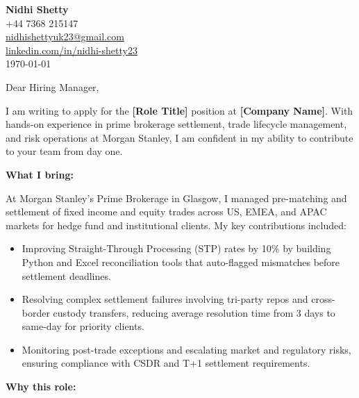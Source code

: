 \documentclass[11pt,a4paper]{article}
\begin{document}
\begin{flushleft}
{\large\bfseries Nidhi Shetty} \\[4pt]
+44 7368 215147 \\
\href{mailto:nidhishettyuk23@gmail.com}{nidhishettyuk23@gmail.com} \\
\href{https://www.linkedin.com/in/nidhi-shetty23-1841b7181}{linkedin.com/in/nidhi-shetty23} \\[16pt]
\today
\end{flushleft}

\vspace{8pt}

Dear Hiring Manager,

\vspace{6pt}

I am writing to apply for the \textbf{[Role Title]} position at \textbf{[Company Name]}. With hands-on experience in prime brokerage settlement, trade lifecycle management, and risk operations at Morgan Stanley, I am confident in my ability to contribute to your team from day one.

\vspace{6pt}

\textbf{What I bring:}

\vspace{2pt}

At Morgan Stanley's Prime Brokerage in Glasgow, I managed pre-matching and settlement of fixed income and equity trades across US, EMEA, and APAC markets for hedge fund and institutional clients. My key contributions included:

\begin{itemize}
    \setlength{\itemsep}{4pt}
    \item Improving Straight-Through Processing (STP) rates by 10\% by building Python and Excel reconciliation tools that auto-flagged mismatches before settlement deadlines.
    \item Resolving complex settlement failures involving tri-party repos and cross-border custody transfers, reducing average resolution time from 3 days to same-day for priority clients.
    \item Monitoring post-trade exceptions and escalating market and regulatory risks, ensuring compliance with CSDR and T+1 settlement requirements.
\end{itemize}

\vspace{4pt}

\textbf{Why this role:}
\end{document}

